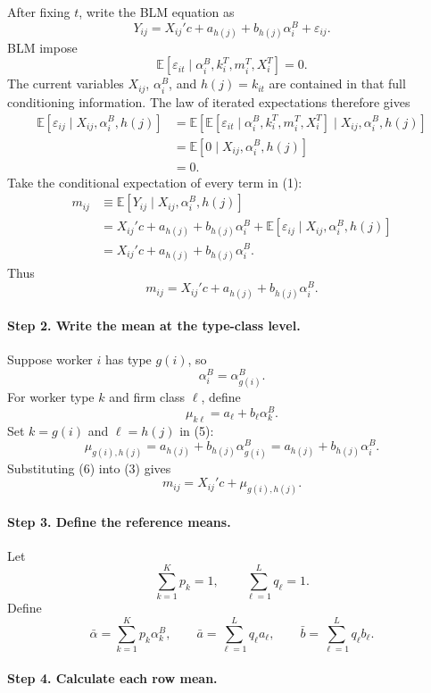 \documentclass[11pt]{article}
\newcommand{\E}{\mathbb E}
\begin{document}
After fixing \(t\), write the BLM equation as
\[
Y_{ij}
=
X_{ij}'c
+
a_{h(j)}
+
b_{h(j)}\alpha_i^B
+
\varepsilon_{ij}.
\tag{1}
\]
BLM impose
\[
\E[\varepsilon_{it}\mid
\alpha_i^B,k_i^T,m_i^T,X_i^T]=0.
\tag{2}
\]
The current variables \(X_{ij}\), \(\alpha_i^B\), and \(h(j)=k_{it}\) are
contained in that full conditioning information.  The law of iterated
expectations therefore gives
\begin{align*}
\E[\varepsilon_{ij}\mid X_{ij},\alpha_i^B,h(j)]
&=
\E\!\left[
\E[\varepsilon_{it}\mid\alpha_i^B,k_i^T,m_i^T,X_i^T]
\mid X_{ij},\alpha_i^B,h(j)
\right]\\
&=\E[0\mid X_{ij},\alpha_i^B,h(j)]\\
&=0.
\tag{2a}
\end{align*}
Take the conditional expectation of every term in (1):
\begin{align*}
m_{ij}
&\equiv
\E[Y_{ij}\mid X_{ij},\alpha_i^B,h(j)]\\
&=
X_{ij}'c
+
a_{h(j)}
+
b_{h(j)}\alpha_i^B
+
\E[\varepsilon_{ij}\mid X_{ij},\alpha_i^B,h(j)]\\
&=
X_{ij}'c+a_{h(j)}+b_{h(j)}\alpha_i^B.
\end{align*}
Thus
\[
m_{ij}=X_{ij}'c+a_{h(j)}+b_{h(j)}\alpha_i^B.
\tag{3}
\]

\paragraph{Step 2. Write the mean at the type-class level.}

Suppose worker \(i\) has type \(g(i)\), so
\[
\alpha_i^B=\alpha_{g(i)}^B.
\tag{4}
\]
For worker type \(k\) and firm class \(\ell\), define
\[
\mu_{k\ell}=a_\ell+b_\ell\alpha_k^B.
\tag{5}
\]
Set \(k=g(i)\) and \(\ell=h(j)\) in (5):
\[
\mu_{g(i),h(j)}
=
a_{h(j)}+b_{h(j)}\alpha_{g(i)}^B
=
a_{h(j)}+b_{h(j)}\alpha_i^B.
\tag{6}
\]
Substituting (6) into (3) gives
\[
m_{ij}=X_{ij}'c+\mu_{g(i),h(j)}.
\tag{7}
\]

\paragraph{Step 3. Define the reference means.}

Let
\[
\sum_{k=1}^Kp_k=1,
\qquad
\sum_{\ell=1}^Lq_\ell=1.
\tag{8}
\]
Define
\[
\bar\alpha=\sum_{k=1}^Kp_k\alpha_k^B,
\qquad
\bar a=\sum_{\ell=1}^Lq_\ell a_\ell,
\qquad
\bar b=\sum_{\ell=1}^Lq_\ell b_\ell.
\tag{9}
\]

\paragraph{Step 4. Calculate each row mean.}
\end{document}
